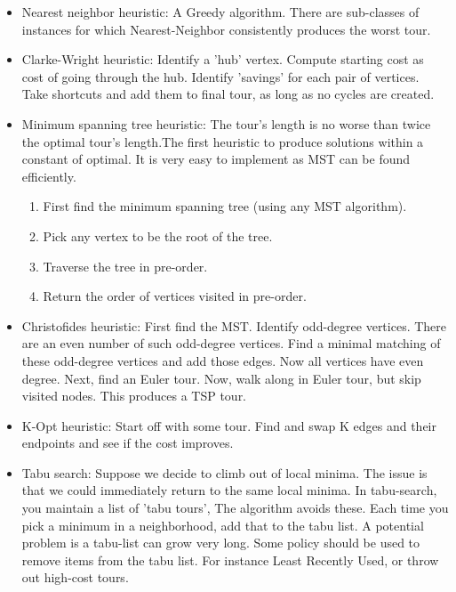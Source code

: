 \documentclass[11pt]{article}
\begin{document}
\begin{itemize}
\item Nearest neighbor heuristic: A Greedy algorithm. There are sub-classes of instances for which Nearest-Neighbor consistently produces the worst tour\cite{guti2007}.
\item Clarke-Wright heuristic\cite{clarke64}: Identify a 'hub' vertex. Compute starting cost as cost of going through the hub. Identify 'savings' for each pair of vertices. Take shortcuts and add them to final tour, as long as no cycles are created.
\item Minimum spanning tree heuristic: The tour's length is no worse than twice the optimal tour's length.The first heuristic to produce solutions within a constant of optimal. It is very easy to implement as MST can be found efficiently.
\begin{enumerate}
\item First find the minimum spanning tree (using any MST algorithm).
\item Pick any vertex to be the root of the tree.
\item Traverse the tree in pre-order.
\item Return the order of vertices visited in pre-order.
\end{enumerate}
\item Christofides heuristic\cite{chris76}: First find the MST. Identify odd-degree vertices. There are an even number of such odd-degree vertices. Find a minimal matching of these odd-degree vertices and add those edges. Now all vertices have even degree. Next, find an Euler tour. Now, walk along in Euler tour, but skip visited nodes. This produces a TSP tour.
\item K-Opt heuristic\cite{twoopt}: Start off with some tour. Find and swap K edges and their endpoints and see if the cost improves. 
\item Tabu search\cite{tabu}: Suppose we decide to climb out of local minima. The issue is that we could immediately return to the same local minima. In tabu-search, you maintain a list of 'tabu tours', The algorithm avoids these. Each time you pick a minimum in a neighborhood, add that to the tabu list. A potential problem is a tabu-list can grow very long. Some policy should be used to remove items from the tabu list. For instance Least Recently Used, or throw out high-cost tours.

\end{itemize}
\end{document}
